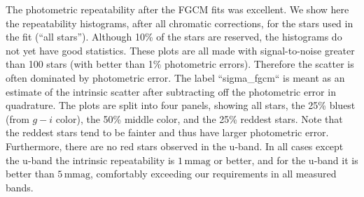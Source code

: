 The photometric repeatability after the FGCM fits was excellent. We show here
the repeatability histograms, after all chromatic corrections, for the stars
used in the fit (``all stars'').  Although 10\% of the stars are reserved,
the histograms do not yet have good statistics.  These plots are all made with
signal-to-noise greater than 100 stars (with better than 1\% photometric
errors).  Therefore the scatter is often dominated by photometric error.  The
label ``sigma\_fgcm`` is meant as an estimate of the intrinsic scatter after
subtracting off the photometric error in quadrature. The plots are split into
four panels, showing all stars, the 25\% bluest (from $g-i$ color), the 50\%
middle color, and the 25\% reddest stars. Note that the reddest stars tend to
be fainter and thus have larger photometric error. Furthermore, there are no
red stars observed in the u-band. In all cases except the u-band the intrinsic
repeatability is $1\,\mathrm{mmag}$ or better, and for the u-band it is better
than $5\,\mathrm{mmag}$, comfortably exceeding our requirements in all measured bands.

